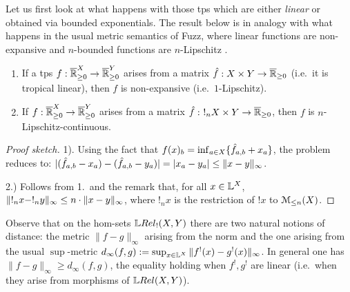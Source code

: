 Let us first look at what happens with those tps which are either \emph{linear} or obtained via bounded exponentials.
The result below is in analogy with what happens in the usual metric semantics of Fuzz, where 
linear functions are non-expansive and $n$-bounded functions are $n$-Lipschitz \cite{Reed2010}.


\begin{proposition}\label{prop:troplinear}
\begin{enumerate}
\item If a tps $f: \overline{\mathbb{R}}_{\geq 0}^{X}\to \overline{\mathbb{R}}_{\geq 0}^{Y}$ arises from a matrix $\hat{f}:X\times Y\to \overline{\mathbb{R}}_{\geq 0}$ (i.e.~it is tropical linear), then $f$ is non-expansive (i.e.\ $1$-Lipschitz).  
\item If  $f: \overline{\mathbb{R}}_{\geq 0}^{X}\to \overline{\mathbb{R}}_{\geq 0}^{Y}$ arises from a matrix $\hat{f}: \ !_{n}X\times Y\to \overline{\mathbb{R}}_{\geq 0}$, then $f$ is $n$-Lipschitz-continuous.
\end{enumerate}
\end{proposition}
\begin{proof}[Proof sketch]
1). Using the fact that $f( x)_{b}= \inf_{a\in X}\{\hat{f}_{a,b}+ x_{a}\}$,
the problem reduces to: $|(\hat{f}_{a,b}- x_{a})- (\hat{f}_{a,b}- y_{a})| = |x_{a}- y_{a}|\leq \lVert x- y\rVert_{\infty}$. %

2.) Follows from 1.~and the remark that, for all $x\in \mathbb{L}^{X}$, $\lVert !_{n} x-!_{n} y\rVert_{\infty}\leq n\cdot \lVert x- y\rVert_{\infty}$, where $!_{n} x$ is the restriction of $! x$ to $\mathcal{M}_{\leq n}(X)$.%
\end{proof} 

Observe that on the hom-sets $\HOM{\LREL_{!}}{X}{Y}$ there are two natural notions of distance: the metric $\| f-g\|_{\infty}$ arising from the norm and the one arising from the usual $\sup$-metric $d_\infty(f,g):=\sup_{x\in \mathbb{L}^{X}} \|f^{!}(x)-g^{!}(x)\|_{\infty}$.
In general one has $\| f-g\|_{\infty}\geq d_\infty(f,g)$, the equality holding when $f^{!},g^{!}$ are linear (i.e.~when they arise from morphisms of $ \LREL(X,Y)$).
 
